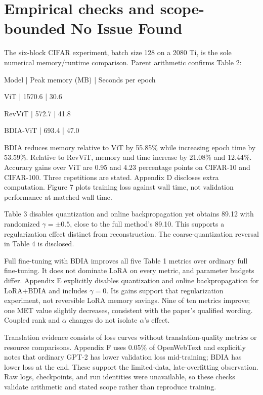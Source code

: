 \documentclass[10pt]{article}
\begin{document}
\section*{Empirical checks and scope-bounded No Issue Found}
The six-block CIFAR experiment, batch size 128 on a 2080 Ti, is the sole numerical memory/runtime comparison. Parent arithmetic confirms Table 2:\par
Model | Peak memory (MB) | Seconds per epoch\par
ViT | 1570.6 | 30.6\par
RevViT | 572.7 | 41.8\par
BDIA-ViT | 693.4 | 47.0\par
BDIA reduces memory relative to ViT by 55.85\% while increasing epoch time by 53.59\%. Relative to RevViT, memory and time increase by 21.08\% and 12.44\%. Accuracy gains over ViT are 0.95 and 4.23 percentage points on CIFAR-10 and CIFAR-100. Three repetitions are stated. Appendix D discloses extra computation. Figure 7 plots training loss against wall time, not validation performance at matched wall time.\par
Table 3 disables quantization and online backpropagation yet obtains 89.12 with randomized \(\gamma=\pm0.5\), close to the full method’s 89.10. This supports a regularization effect distinct from reconstruction. The coarse-quantization reversal in Table 4 is disclosed.\par
Full fine-tuning with BDIA improves all five Table 1 metrics over ordinary full fine-tuning. It does not dominate LoRA on every metric, and parameter budgets differ. Appendix E explicitly disables quantization and online backpropagation for LoRA+BDIA and includes \(\gamma=0\). Its gains support that regularization experiment, not reversible LoRA memory savings. Nine of ten metrics improve; one MET value slightly decreases, consistent with the paper’s qualified wording. Coupled rank and \(\alpha\) changes do not isolate \(\alpha\)’s effect.\par
Translation evidence consists of loss curves without translation-quality metrics or resource comparisons. Appendix F uses 0.05\% of OpenWebText and explicitly notes that ordinary GPT-2 has lower validation loss mid-training; BDIA has lower loss at the end. These support the limited-data, late-overfitting observation. Raw logs, checkpoints, and run identities were unavailable, so these checks validate arithmetic and stated scope rather than reproduce training.\par
\end{document}
